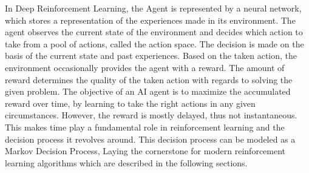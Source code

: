 \documentclass[12pt,a4paper]{article}
\begin{document}
In Deep Reinforcement Learning, the Agent is represented by a neural network, which stores a representation of the experiences made in its environment. The agent observes the current state of the environment and decides which action to take from a pool of actions, called the action space.
The decision is made on the basis of the current state and past experiences. Based on the taken action, the environment occasionally provides the agent with a reward. The amount of reward determines the quality of the taken action with regards to solving the given problem.
The objective of an AI agent is to maximize the accumulated reward over time, by learning to take the right actions in any given circumstances.
However, the reward is mostly delayed, thus not instantaneous. This makes time play a fundamental role in reinforcement learning and the decision process it revolves around.
This decision process can be modeled as a Markov Decision Process, Laying the cornerstone for modern reinforcement learning algorithms which are described in the following sections.
\end{document}
